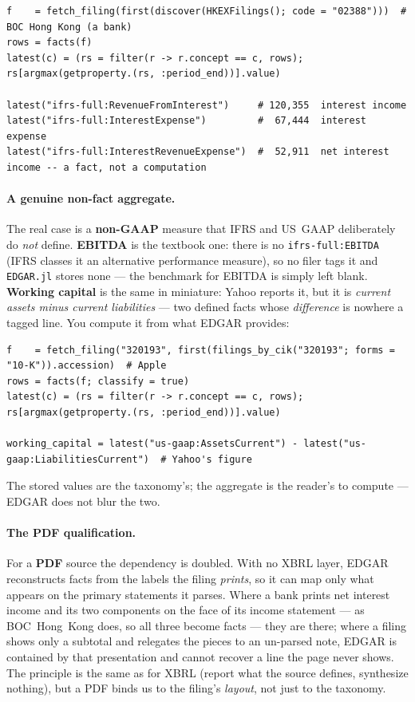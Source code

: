\documentclass[11pt,a4paper]{report}
\begin{document}
\begin{lstlisting}
f    = fetch_filing(first(discover(HKEXFilings(); code = "02388")))  # BOC Hong Kong (a bank)
rows = facts(f)
latest(c) = (rs = filter(r -> r.concept == c, rows); rs[argmax(getproperty.(rs, :period_end))].value)

latest("ifrs-full:RevenueFromInterest")     # 120,355  interest income
latest("ifrs-full:InterestExpense")         #  67,444  interest expense
latest("ifrs-full:InterestRevenueExpense")  #  52,911  net interest income -- a fact, not a computation
\end{lstlisting}

\paragraph{A genuine non-fact aggregate.} The real case is a \textbf{non-GAAP} measure that IFRS and US~GAAP
deliberately do \emph{not} define. \textbf{EBITDA} is the textbook one: there is no \texttt{ifrs-full:EBITDA}
(IFRS classes it an alternative performance measure), so no filer tags it and \texttt{EDGAR.jl} stores none ---
the benchmark for EBITDA is simply left blank. \textbf{Working capital} is the same in miniature: Yahoo reports
it, but it is \emph{current assets minus current liabilities} --- two defined facts whose \emph{difference} is
nowhere a tagged line. You compute it from what EDGAR provides:

\begin{lstlisting}
f    = fetch_filing("320193", first(filings_by_cik("320193"; forms = "10-K")).accession)  # Apple
rows = facts(f; classify = true)
latest(c) = (rs = filter(r -> r.concept == c, rows); rs[argmax(getproperty.(rs, :period_end))].value)

working_capital = latest("us-gaap:AssetsCurrent") - latest("us-gaap:LiabilitiesCurrent")  # Yahoo's figure
\end{lstlisting}

\noindent The stored values are the taxonomy's; the aggregate is the reader's to compute --- EDGAR does not
blur the two.

\paragraph{The PDF qualification.} For a \textbf{PDF} source the dependency is doubled. With no XBRL layer,
EDGAR reconstructs facts from the labels the filing \emph{prints}, so it can map only what appears on the
primary statements it parses. Where a bank prints net interest income and its two components on the face of its
income statement --- as BOC~Hong~Kong does, so all three become facts --- they are there; where a filing shows
only a subtotal and relegates the pieces to an un-parsed note, EDGAR is contained by that presentation and
cannot recover a line the page never shows. The principle is the same as for XBRL (report what the source
defines, synthesize nothing), but a PDF binds us to the filing's \emph{layout}, not just to the taxonomy.
\end{document}
